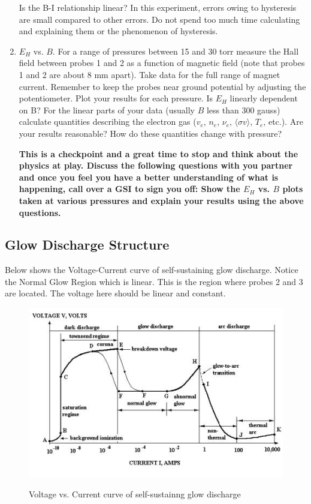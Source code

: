 \documentclass{../lab}
\begin{document}
\begin{enumerate}
    Is the B-I relationship linear? In this experiment, errors owing to hysteresis are small compared to other errors. Do not spend too much time calculating and explaining them or the phenomenon of hysteresis.

    \item $E_H$ vs. $B$. For a range of pressures between 15 and 30 torr measure the Hall field between probes 1 and 2 as a function of magnetic field (note that probes 1 and 2 are about 8 mm apart). Take data for the full range of magnet current. Remember to keep the probes near ground potential by adjusting the potentiometer. Plot your results for each pressure. Is $E_H$ linearly dependent on B? For the linear parts of your data (usually $B$ less than 300 gauss) calculate quantities describing the electron gas ($v_e$, $n_e$, $\nu_e$, $\langle \sigma v \rangle$, $T_e$, etc.). Are your results reasonable? How do these quantities change with pressure?

\textbf{This is a checkpoint and a great time to stop and think about the physics at play. Discuss the following questions with you partner and once you feel you have a better understanding of what is happening, call over a GSI to sign you off:
Show the $E_H$ vs. $B$ plots taken at various pressures and explain your results using the above questions.}

\end{enumerate}

\subsection{Glow Discharge Structure}

Below shows the Voltage-Current curve of self-sustaining glow discharge. Notice the Normal Glow Region which is linear. This is the region where probes 2 and 3 are located. The voltage here should be linear and constant.

\begin{figure}[h]
    \centering
    \href{http://experimentationlab.berkeley.edu/sites/default/files/images/DischargeStructure.jpg}{\includegraphics[width=0.8\linewidth]{images/DischargeStructure.jpg}}
    \caption{Voltage vs. Current curve of self-sustainng glow discharge}
\end{figure}
\end{document}
